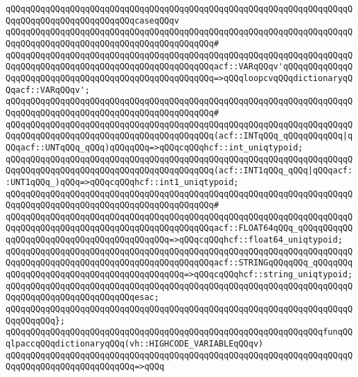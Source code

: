 \newline
\verb|qQQqqQQqqQQqqQQqqQQqqQQqqQQqqQQqqQQqqQQqqQQqqQQqqQQqqQQqqQQqqQQqqQQqqQQqqQQqqQQqqQQqqQQqqQQqqQQqcaseqQQqv|\newline
\verb|qQQqqQQqqQQqqQQqqQQqqQQqqQQqqQQqqQQqqQQqqQQqqQQqqQQqqQQqqQQqqQQqqQQqqQQqqQQqqQQqqQQqqQQqqQQqqQQqqQQqqQQqqQQqqQQq#|\newline
\verb|qQQqqQQqqQQqqQQqqQQqqQQqqQQqqQQqqQQqqQQqqQQqqQQqqQQqqQQqqQQqqQQqqQQqqQQqqQQqqQQqqQQqqQQqqQQqqQQqqQQqqQQqqQQqqQQqacf::VARqQQqv'qQQqqQQqqQQqqQQqqQQqqQQqqQQqqQQqqQQqqQQqqQQqqQQqqQQqqQQq=>qQQqloopcvqQQqdictionaryqQQqacf::VARqQQqv';|\newline
\verb|qQQqqQQqqQQqqQQqqQQqqQQqqQQqqQQqqQQqqQQqqQQqqQQqqQQqqQQqqQQqqQQqqQQqqQQqqQQqqQQqqQQqqQQqqQQqqQQqqQQqqQQqqQQqqQQq#|\newline
\verb|qQQqqQQqqQQqqQQqqQQqqQQqqQQqqQQqqQQqqQQqqQQqqQQqqQQqqQQqqQQqqQQqqQQqqQQqqQQqqQQqqQQqqQQqqQQqqQQqqQQqqQQqqQQqqQQq(acf::INTqQQq_qQQqqQQqqQQq|\verb#|qQQqacf::UNTqQQq_qQQq)qQQqqQQq=>qQQqcqQQqhcf::int_uniqtypoid;#\newline
\verb|qQQqqQQqqQQqqQQqqQQqqQQqqQQqqQQqqQQqqQQqqQQqqQQqqQQqqQQqqQQqqQQqqQQqqQQqqQQqqQQqqQQqqQQqqQQqqQQqqQQqqQQqqQQqqQQq(acf::INT1qQQq_qQQq|\verb#|qQQqacf::UNT1qQQq_)qQQq=>qQQqcqQQqhcf::int1_uniqtypoid;#\newline
\verb|qQQqqQQqqQQqqQQqqQQqqQQqqQQqqQQqqQQqqQQqqQQqqQQqqQQqqQQqqQQqqQQqqQQqqQQqqQQqqQQqqQQqqQQqqQQqqQQqqQQqqQQqqQQqqQQq#|\newline
\verb|qQQqqQQqqQQqqQQqqQQqqQQqqQQqqQQqqQQqqQQqqQQqqQQqqQQqqQQqqQQqqQQqqQQqqQQqqQQqqQQqqQQqqQQqqQQqqQQqqQQqqQQqqQQqqQQqacf::FLOAT64qQQq_qQQqqQQqqQQqqQQqqQQqqQQqqQQqqQQqqQQqqQQqqQQq=>qQQqcqQQqhcf::float64_uniqtypoid;|\newline
\verb|qQQqqQQqqQQqqQQqqQQqqQQqqQQqqQQqqQQqqQQqqQQqqQQqqQQqqQQqqQQqqQQqqQQqqQQqqQQqqQQqqQQqqQQqqQQqqQQqqQQqqQQqqQQqqQQqacf::STRINGqQQqqQQq_qQQqqQQqqQQqqQQqqQQqqQQqqQQqqQQqqQQqqQQqqQQq=>qQQqcqQQqhcf::string_uniqtypoid;|\newline
\verb|qQQqqQQqqQQqqQQqqQQqqQQqqQQqqQQqqQQqqQQqqQQqqQQqqQQqqQQqqQQqqQQqqQQqqQQqqQQqqQQqqQQqqQQqqQQqqQQqesac;|\newline
\verb|qQQqqQQqqQQqqQQqqQQqqQQqqQQqqQQqqQQqqQQqqQQqqQQqqQQqqQQqqQQqqQQqqQQqqQQqqQQqqQQq};|\newline
\newline
\verb|qQQqqQQqqQQqqQQqqQQqqQQqqQQqqQQqqQQqqQQqqQQqqQQqqQQqqQQqqQQqqQQqfunqQQqlpaccqQQqdictionaryqQQq(vh::HIGHCODE_VARIABLEqQQqv)|\newline
\verb|qQQqqQQqqQQqqQQqqQQqqQQqqQQqqQQqqQQqqQQqqQQqqQQqqQQqqQQqqQQqqQQqqQQqqQQqqQQqqQQqqQQqqQQqqQQqqQQq=>qQQq|\newline
